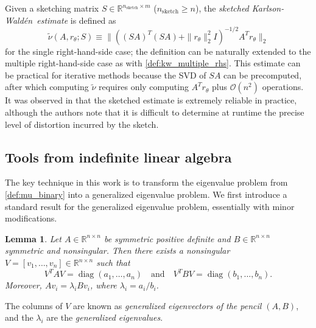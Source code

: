 \documentclass{article}
\newtheorem{lemma}{Lemma}
\newcommand{\ts}{^T}
\DeclareMathOperator{\Diag}{diag}
\newcommand{\KW}{Karlson-Wald\'{e}n~}
\newtheorem{remark}{Remark}
\begin{document}
Given a sketching matrix $S\in \mathbb{R}^{n_{\text{sketch}}\times m}$ ($n_{\text{sketch}} \geq n$), the {\em sketched \KW estimate} is defined as 
\begin{equation}\label{def:sketched_kw_estimate}
    \widetilde{\nu}(A,r_\theta; S) \equiv \|((SA)\ts (SA) + \|r_\theta\|_2^2I)^{-1/2}A\ts r_\theta\|_2
\end{equation}
for the single right-hand-side case; the definition can be naturally extended to the multiple right-hand-side case as with \cref{def:kw_multiple_rhs}. This estimate can be practical for iterative methods because the SVD of $SA$ can be precomputed, after which computing $\widetilde{\nu}$ requires only computing $A\ts r_\theta$ plus $\mathcal{O}(n^2)$ operations. It was observed in \cite{epperly2026fast} that the sketched estimate is extremely reliable in practice, although the authors note that it is difficult to determine at runtime the precise level of distortion incurred by the sketch.




\subsection{Tools from indefinite linear algebra}
The key technique in this work is to transform the eigenvalue problem from \cref{def:mu_binary} into a generalized eigenvalue problem. We first introduce a standard result for the generalized eigenvalue problem, essentially \cite[Cor.~8.7.2]{GoVa13} with minor modifications.
\begin{lemma}\label{lemma:gen_evp_basic}
    Let $A\in \mathbb{R}^{n\times n}$ be symmetric positive definite and $B\in \mathbb{R}^{n\times n}$ symmetric and nonsingular. Then there exists a nonsingular $V = [v_1,\ldots,v_n]\in \mathbb{R}^{n\times n}$ such that
    \[V\ts AV = \Diag(a_1,\ldots, a_n)\quad \text{and}\quad V\ts BV = \Diag(b_1,\ldots,b_n).\]
    Moreover, $Av_i = \lambda_i Bv_i$, where $\lambda_i = a_i/b_i$. 
\end{lemma}
The columns of $V$ are known as {\em generalized eigenvectors of the pencil $(A,B)$}, and the $\lambda_i$ are the {\em generalized eigenvalues}.
\end{document}
